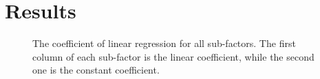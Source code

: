 \section{Results}
\begin{figure}[htbp]
\centering
{}
\quad
{}
\caption{The coefficient of linear regression for all sub-factors. The first column of each sub-factor is the linear coefficient, while the second one is the constant coefficient.}\label{regression_coefficient}
\end{figure}
